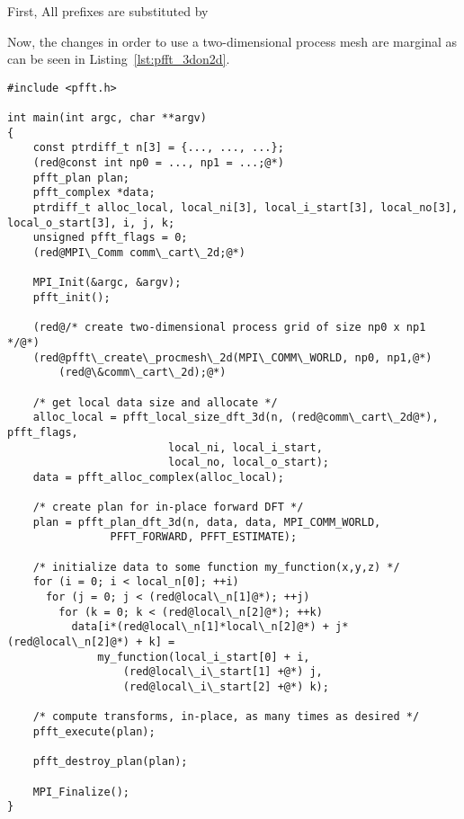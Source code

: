 First, All prefixes  are substituted by 

Now, the changes in order to use a two-dimensional process mesh are marginal as can be seen in Listing~\ref{lst:pfft_3don2d}.
\begin{lstlisting}
#include <pfft.h>
     
int main(int argc, char **argv)
{
    const ptrdiff_t n[3] = {..., ..., ...};
    (red@const int np0 = ..., np1 = ...;@*)
    pfft_plan plan;
    pfft_complex *data;
    ptrdiff_t alloc_local, local_ni[3], local_i_start[3], local_no[3], local_o_start[3], i, j, k;
    unsigned pfft_flags = 0;
    (red@MPI\_Comm comm\_cart\_2d;@*)

    MPI_Init(&argc, &argv);
    pfft_init();

    (red@/* create two-dimensional process grid of size np0 x np1 */@*)
    (red@pfft\_create\_procmesh\_2d(MPI\_COMM\_WORLD, np0, np1,@*)
        (red@\&comm\_cart\_2d);@*)
    
    /* get local data size and allocate */
    alloc_local = pfft_local_size_dft_3d(n, (red@comm\_cart\_2d@*), pfft_flags,
				         local_ni, local_i_start,
				         local_no, local_o_start);
    data = pfft_alloc_complex(alloc_local);

    /* create plan for in-place forward DFT */
    plan = pfft_plan_dft_3d(n, data, data, MPI_COMM_WORLD,
			    PFFT_FORWARD, PFFT_ESTIMATE);

    /* initialize data to some function my_function(x,y,z) */
    for (i = 0; i < local_n[0]; ++i) 
      for (j = 0; j < (red@local\_n[1]@*); ++j) 
        for (k = 0; k < (red@local\_n[2]@*); ++k)
          data[i*(red@local\_n[1]*local\_n[2]@*) + j*(red@local\_n[2]@*) + k] =
              my_function(local_i_start[0] + i,
		          (red@local\_i\_start[1] +@*) j,
		          (red@local\_i\_start[2] +@*) k);

    /* compute transforms, in-place, as many times as desired */
    pfft_execute(plan);

    pfft_destroy_plan(plan);

    MPI_Finalize();
}
\end{lstlisting}







